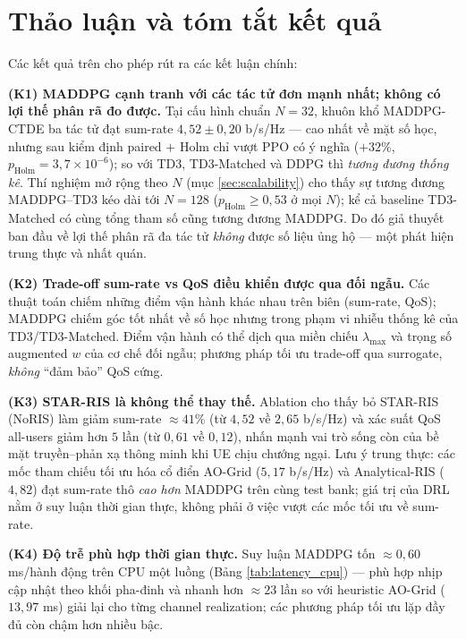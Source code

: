 \section{Thảo luận và tóm tắt kết quả}
\label{sec:discussion}

Các kết quả trên cho phép rút ra các kết luận chính:

\textbf{(K1) MADDPG cạnh tranh với các tác tử đơn mạnh nhất; không có
lợi thế phân rã đo được.} Tại cấu hình chuẩn $N=32$, khuôn khổ
MADDPG-CTDE ba tác tử đạt sum-rate $4{,}52 \pm 0{,}20$ b/s/Hz --- cao
nhất về mặt số học, nhưng sau kiểm định paired $+$ Holm chỉ vượt PPO có
ý nghĩa ($+32\%$, $p_{\text{Holm}} = 3{,}7\times 10^{-6}$); so với TD3,
TD3-Matched và DDPG thì \emph{tương đương thống kê}. Thí nghiệm mở rộng
theo $N$ (mục \ref{sec:scalability}) cho thấy sự tương đương MADDPG--TD3
kéo dài tới $N=128$ ($p_{\text{Holm}} \geq 0{,}53$ ở mọi $N$); kể cả
baseline TD3-Matched có cùng tổng tham số cũng tương đương MADDPG. Do
đó giả thuyết ban đầu về lợi thế phân rã đa tác tử \emph{không} được số
liệu ủng hộ --- một phát hiện trung thực và nhất quán.

\textbf{(K2) Trade-off sum-rate vs QoS điều khiển được qua đối ngẫu.}
Các thuật toán chiếm những điểm vận hành khác nhau trên biên
(sum-rate, QoS); MADDPG chiếm góc tốt nhất về số học nhưng trong phạm
vi nhiễu thống kê của TD3/TD3-Matched. Điểm vận hành có thể dịch qua
miền chiếu $\lambda_{\max}$ và trọng số augmented $w$ của cơ chế đối
ngẫu; phương pháp tối ưu trade-off qua surrogate, \emph{không} ``đảm
bảo'' QoS cứng.

\textbf{(K3) STAR-RIS là không thể thay thế.} Ablation cho thấy bỏ
STAR-RIS (NoRIS) làm giảm sum-rate $\approx 41\%$ (từ $4{,}52$ về
$2{,}65$ b/s/Hz) và xác suất QoS all-users giảm hơn $5$ lần (từ
$0{,}61$ về $0{,}12$), nhấn mạnh vai trò sống còn của bề mặt
truyền--phản xạ thông minh khi UE chịu chướng ngại. Lưu ý trung
thực: các mốc tham chiếu tối ưu hóa cổ điển AO-Grid ($5{,}17$ b/s/Hz)
và Analytical-RIS ($4{,}82$) đạt sum-rate thô \emph{cao hơn} MADDPG
trên cùng test bank; giá trị của DRL nằm ở suy luận thời gian thực,
không phải ở việc vượt các mốc tối ưu về sum-rate.

\textbf{(K4) Độ trễ phù hợp thời gian thực.} Suy luận MADDPG tốn
$\approx 0{,}60$ ms/hành động trên CPU một luồng (Bảng
\ref{tab:latency_cpu}) --- phù hợp nhịp cập nhật theo khối pha-đinh và
nhanh hơn $\approx 23$ lần so với heuristic AO-Grid ($13{,}97$ ms) giải
lại cho từng channel realization; các phương pháp tối ưu lặp đầy đủ còn
chậm hơn nhiều bậc.

